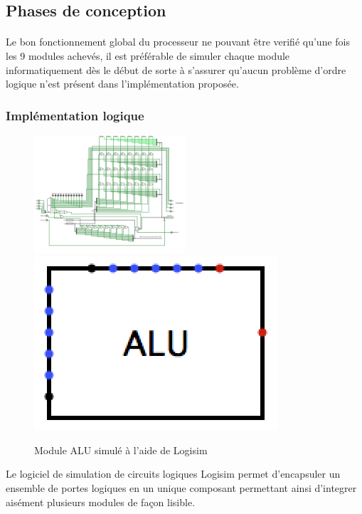 \documentclass{article}
\begin{document}
    \subsection{Phases de conception}

    \paragraph{}
    Le bon fonctionnement global du processeur ne pouvant être verifié qu'une fois les 9 modules
    achevés, il est préférable de simuler chaque module informatiquement dès le début de sorte à s'assurer
    qu'aucun problème d'ordre logique n'est présent dans l'implémentation proposée.  


    \subsubsection{Implémentation logique}

    \begin{figure}[ht!]
        \label{fig_ALU_logisim}
        \centering
        \includegraphics[width=0.5\textwidth]{figures/ALU_logisim.png}
        \includegraphics{figures/ALU_MOD.png}
        \caption{Module ALU simulé à l'aide de Logisim}
    \end{figure}

    Le logiciel de simulation de circuits logiques Logisim permet d'encapsuler un ensemble de portes
    logiques en un unique composant permettant ainsi d'integrer aisément plusieurs modules de façon lisible. 
\end{document}
